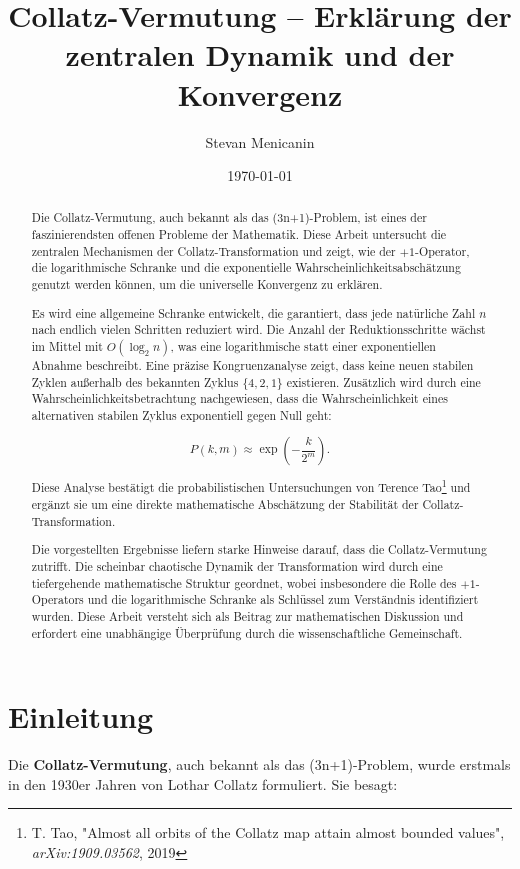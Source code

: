 \documentclass[a4paper,12pt]{article}
\title{Collatz-Vermutung – Erklärung der zentralen Dynamik und der Konvergenz}
\author{Stevan Menicanin}
\date{\today}
\begin{document}
\maketitle

\begin{abstract}
    Die Collatz-Vermutung, auch bekannt als das (3n+1)-Problem, ist eines der faszinierendsten offenen Probleme der Mathematik. Diese Arbeit untersucht die zentralen Mechanismen der Collatz-Transformation und zeigt, wie der \(+1\)-Operator, die logarithmische Schranke und die exponentielle Wahrscheinlichkeitsabschätzung genutzt werden können, um die universelle Konvergenz zu erklären.

    Es wird eine allgemeine Schranke entwickelt, die garantiert, dass jede natürliche Zahl \( n \) nach endlich vielen Schritten reduziert wird. Die Anzahl der Reduktionsschritte wächst im Mittel mit \( O(\log_2 n) \), was eine logarithmische statt einer exponentiellen Abnahme beschreibt. Eine präzise Kongruenzanalyse zeigt, dass keine neuen stabilen Zyklen außerhalb des bekannten Zyklus \( \{4, 2, 1\} \) existieren. Zusätzlich wird durch eine Wahrscheinlichkeitsbetrachtung nachgewiesen, dass die Wahrscheinlichkeit eines alternativen stabilen Zyklus exponentiell gegen Null geht:

    \[
    P(k,m) \approx \exp\left(-\frac{k}{2^m}\right).
    \]

    Diese Analyse bestätigt die probabilistischen Untersuchungen von Terence Tao\footnote{T. Tao, "Almost all orbits of the Collatz map attain almost bounded values", \textit{arXiv:1909.03562}, 2019} und ergänzt sie um eine direkte mathematische Abschätzung der Stabilität der Collatz-Transformation.

    Die vorgestellten Ergebnisse liefern starke Hinweise darauf, dass die Collatz-Vermutung zutrifft. Die scheinbar chaotische Dynamik der Transformation wird durch eine tiefergehende mathematische Struktur geordnet, wobei insbesondere die Rolle des \(+1\)-Operators und die logarithmische Schranke als Schlüssel zum Verständnis identifiziert wurden. Diese Arbeit versteht sich als Beitrag zur mathematischen Diskussion und erfordert eine unabhängige Überprüfung durch die wissenschaftliche Gemeinschaft.
\end{abstract}

\newpage
\tableofcontents

\newpage


\section{Einleitung}
Die \textbf{Collatz-Vermutung}, auch bekannt als das (3n+1)-Problem, wurde erstmals in den 1930er Jahren von Lothar Collatz formuliert. Sie besagt:
\end{document}

